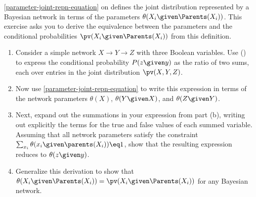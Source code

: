 \begin{exercise}
\eqref{parameter-joint-repn-equation} on  defines the joint
distribution represented by a Bayesian network in terms of
the parameters \(\theta(X_i\given \Parents(X_i))\). This exercise asks you to derive the equivalence
between the parameters and the conditional probabilities \(\pv(X_i\given \Parents(X_i))\) from this definition.
\begin{enumerate}
\item Consider a simple network \(X\rightarrow Y\rightarrow Z\) with three Boolean variables. 
Use  () to express the conditional probability \(P(z\given y)\) as the ratio of two sums, each over entries in the joint distribution \(\pv(X,Y,Z)\).
\item Now use \eqref{parameter-joint-repn-equation} to write this expression in terms of the network parameters \(\theta(X)\), \(\theta(Y\given X)\), and \(\theta(Z\given Y)\).
\item Next, expand out the summations in your expression from part (b), writing out explicitly the terms for the true and false values of each summed variable.
Assuming that all network parameters satisfy the constraint \(\sum_{x_i} \theta(x_i\given \parents(X_i))\eq 1\), show that the resulting expression reduces to \(\theta(z\given y)\).
\item Generalize this derivation to show that \(\theta(X_i\given \Parents(X_i)) = \pv(X_i\given \Parents(X_i))\) for any Bayesian network.
\end{enumerate}
\end{exercise} 

